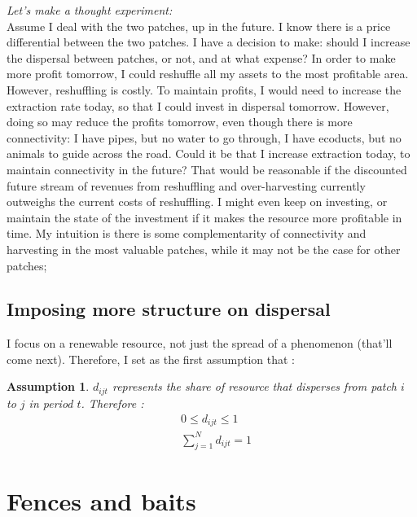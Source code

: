 \documentclass{article}
\newtheorem{assumption}{Assumption}
\begin{document}
\textit{Let's make a thought experiment:}\\
Assume I deal with the two patches, up in the future. I know there is a price differential between the two patches. I have a decision to make: should I increase the dispersal between patches, or not, and at what expense? In order to make more profit tomorrow, I could reshuffle all my assets to the most profitable area. However, reshuffling is costly. To maintain profits, I would need to increase the extraction rate today, so that I could invest in dispersal tomorrow. However, doing so may reduce the profits tomorrow, even though there is more connectivity: I have pipes, but no water to go through, I have ecoducts, but no animals to guide across the road. Could it be that I increase extraction today, to maintain connectivity in the future? That would be reasonable if the discounted future stream of revenues from reshuffling and over-harvesting currently outweighs the current costs of reshuffling. I might even keep on investing, or maintain the state of the investment if it makes the resource more profitable in time. My intuition is there is some complementarity of connectivity and harvesting in the most valuable patches, while it may not be the case for other patches; 

\subsection{Imposing more structure on dispersal}
I focus on a renewable resource, not just the spread of a phenomenon (that'll come next). Therefore, I set as the first assumption that :
\begin{assumption}
    $d_{ijt}$ represents the share of resource that disperses from patch $i$ to $j$ in period $t$. Therefore : 
    \begin{align*}
    &0 \leq d_{ijt} \leq 1\\
    &\sum_{j=1}^N d_{ijt}=1
    \end{align*}
\end{assumption}
\newpage

\section{Fences and baits}
\end{document}
